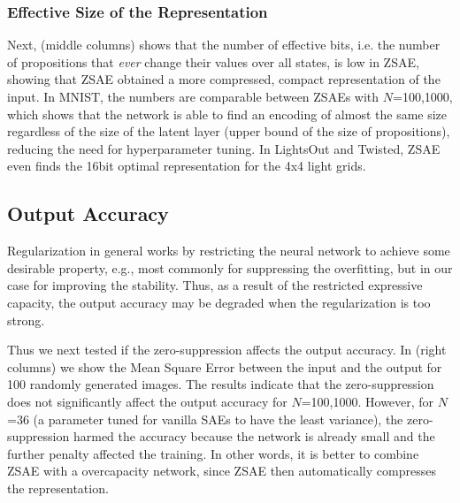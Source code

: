 \subsubsection{Effective Size of the Representation}

Next,  (middle columns) shows that the number of effective bits,
i.e. the number of propositions that \emph{ever} change their values over all states, is low in ZSAE, showing that
ZSAE obtained a more compressed, compact representation of the input.
In MNIST, the numbers are comparable between ZSAEs with $N$=100,1000,
which shows that the network is able to find an encoding of almost the same size
regardless of the size of the latent layer (upper bound of the size of
propositions), reducing the need for hyperparameter tuning.
In LightsOut and Twisted, ZSAE even finds the 16bit optimal representation for the 4x4 light grids.


\subsection{Output Accuracy}

Regularization in general works by restricting the neural network
to achieve some desirable property, e.g., most commonly for suppressing the overfitting, but in our case
for improving the stability. Thus, as a result of the restricted expressive capacity, the output accuracy may be degraded
when the regularization is too strong.

Thus we next tested if the zero-suppression affects the output accuracy.
In  (right columns)
we show the Mean Square Error between the input and the output
for 100 randomly generated images.
The results indicate that the zero-suppression does not significantly affect the output accuracy for $N$=100,1000.
However, for $N$=36 (a parameter tuned for vanilla SAEs to have the least variance), the zero-suppression
harmed the accuracy because the network is already small and the further penalty affected the training.
In other words, it is better to combine ZSAE with a overcapacity network,
since ZSAE then automatically compresses the representation.

